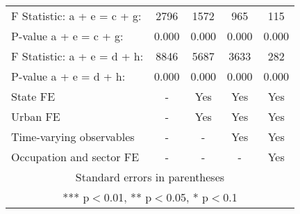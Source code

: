 \begin{tabular}{lcccc}
F Statistic: a + e = c  + g: & 2796 & 1572 & 965 & 115 \\
\hspace{1mm} P-value a + e = c + g: & 0.000 & 0.000 & 0.000 & 0.000 \\
F Statistic: a + e = d + h: & 8846 & 5687 & 3633 & 282 \\
\hspace{1mm} P-value a + e = d + h: & 0.000 & 0.000 & 0.000 & 0.000 \\
State FE & - & Yes & Yes & Yes \\
Urban FE & - & Yes & Yes & Yes \\
Time-varying observables & - & - & Yes & Yes \\
 Occupation and sector FE & - & - & - & Yes \\ \hline
\multicolumn{5}{c}{ Standard errors in parentheses} \\
\multicolumn{5}{c}{ *** p$<$0.01, ** p$<$0.05, * p$<$0.1} \\
\end{tabular}

